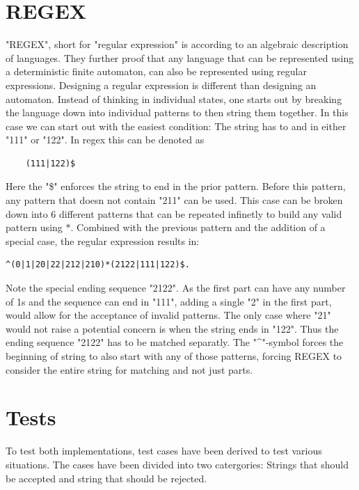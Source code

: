 \documentclass{article}
\begin{document}
\section{REGEX}
"REGEX", short for "regular expression" is according to \cite{hopcroft2001introduction} an algebraic description of languages.
They further proof that any language that can be represented using a deterministic finite automaton, can also be represented using 
regular expressions. Designing a regular expression is different than designing an automaton.
Instead of thinking in individual states, one starts out by breaking the language down into individual patterns
to then string them together. In this case we can start out with the easiest condition:
The string has to and in either "111" or "122". In regex this can be denoted as 
\begin{lstlisting}
    (111|122)$
\end{lstlisting}
Here the "\$" enforces the string to end in the prior pattern.
Before this pattern, any pattern that doesn not contain "211" can be used.
This case can be broken down into 6 different patterns that can be repeated infinetly to build any valid pattern using $*$. 
Combined with the previous pattern and the addition of a special case, the regular expression results in:
\begin{lstlisting}
^(0|1|20|22|212|210)*(2122|111|122)$.
\end{lstlisting}
Note the special ending sequence "2122". As the first part can have any number of 1s and the sequence can end in "111",
adding a single "2" in the first part, would allow for the acceptance of invalid patterns. The only case 
where "21" would not raise a potential concern is when the string ends in "122". Thus the ending sequence "2122" has to be matched separatly. 
The "\string^"-symbol forces the beginning of string to also start with any of those patterns,
forcing REGEX to consider the entire string for matching and not just parts.


\section{Tests}
To test both implementations, test cases have been derived to test various situations.
The cases have been divided into two catergories: Strings that should be accepted and string that should be rejected.
\end{document}
